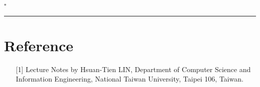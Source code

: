 \documentclass[12pt]{article}
\newcommand*{\QEDB}{\hfill\ensuremath{\square}}
\newcommand{\horrule}[1]{\rule{\linewidth}{#1}}
\begin{document}
\QEDB

\horrule{0.5pt}

\section*{Reference}

\begin{enumerate}

\item[{[1]}] Lecture Notes by Hsuan-Tien LIN, Department of Computer Science and Information Engineering, National Taiwan University, Taipei 106, Taiwan.


\end{enumerate}
\end{document}
